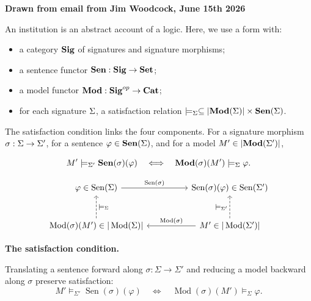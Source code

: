 \documentclass[border=10pt]{standalone}
\newcommand{\clz}{\color{ZedColor}}
\newcommand{\Sig}{\mathbf{Sig}}
\newcommand{\Sen}{\mathbf{Sen}}
\newcommand{\Mod}{\mathbf{Mod}}
\begin{document}
\begin{minipage}{13cm}

\textbf{Drawn from email from Jim Woodcock, June 15th 2026}

An institution is an abstract account of a logic. Here, we use a form with:

\begin{itemize}

\item a category $\clz \Sig$ of signatures and signature morphisms;

\item a sentence functor $\clz \Sen : \Sig \to \mathbf{Set}$;
\item a model functor $\clz \Mod : \Sig^{op} \to \mathbf{Cat}$;
\item for each signature $\clz \Sigma$, a satisfaction relation
      $\clz \models_{\Sigma} \subseteq |\Mod(\Sigma)| \times \Sen(\Sigma)$.
\end{itemize}

The satisfaction condition links the four components. For a signature morphism $\clz \sigma: \Sigma \to \Sigma'$,
for a sentence $\clz \varphi \in \Sen(\Sigma)$, and for a model $\clz M' \in |\Mod(\Sigma')|$,

\begin{equation}\clz
  M' \models_{\Sigma'} \Sen(\sigma)(\varphi)
  \quad\Longleftrightarrow\quad
  \Mod(\sigma)(M') \models_{\Sigma} \varphi .
\end{equation}



  \centering

  \[
    \begin{tikzcd}[column sep=huge,row sep=large]
      \varphi \in \operatorname{Sen}(\Sigma)
      \arrow[r, "{\operatorname{Sen}(\sigma)}"]
      &
      \operatorname{Sen}(\sigma)(\varphi) \in \operatorname{Sen}(\Sigma') \\
      \operatorname{Mod}(\sigma)(M') \in |\operatorname{Mod}(\Sigma)|
      \arrow[u, dashed, "\models_{\Sigma}"']
      &
      M' \in |\operatorname{Mod}(\Sigma')|
      \arrow[l, "{\operatorname{Mod}(\sigma)}"']
      \arrow[u, dashed, "\models_{\Sigma'}"]
    \end{tikzcd}
  \]
 
  \medskip
 
  \small
  \textbf{The satisfaction condition.}
 
  Translating a sentence forward along \(\sigma : \Sigma \to \Sigma'\) and reducing a model backward along \(\sigma\) preserve satisfaction:
  \[
    M' \models_{\Sigma'} \operatorname{Sen}(\sigma)(\varphi)
    \quad \Longleftrightarrow \quad
    \operatorname{Mod}(\sigma)(M') \models_{\Sigma} \varphi .
  \]
 
\end{minipage}
\end{document}
